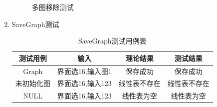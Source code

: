 \documentclass[supercite]{HustGraduPaper}
\theoremstyle{definition}
\begin{document}
\begin{enumerate}
\begin{figure}[htb]
		      \caption{多图移除测试}
	      \end{figure}
	      \newpage
	\item SaveGraph测试
	      \begin{table}[htb]
		      \begin{center}
			      \setlength{\tabcolsep}{2.0mm}
			      \caption{SaveGraph测试用例表}
			      \label{t18}
			      \begin{tabular}{|c|c|c|c|}
				      \hline
				      测试用例   & 输入             & 理论结果     & 测试结果     \\
				      \hline
				      \hline
				      Graph      & 界面选16,输入图1 & 保存成功     & 保存成功     \\
				      \hline
				      未初始化图 & 界面选16,输入123 & 线性表不存在 & 线性表不存在 \\
				      \hline
				      NULL       & 界面选16,输入123 & 线性表为空   & 线性表为空   \\
				      \hline
			      \end{tabular}
		      \end{center}
	      \end{table}
	      \begin{figure}[htb]
		      \centering
		      \quad
		      \quad
		      \\

\end{figure}
\end{enumerate}
\end{document}
